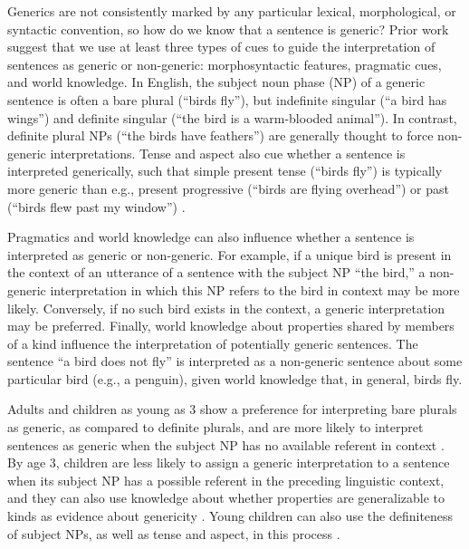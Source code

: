 \documentclass[10pt,letterpaper]{article}
\begin{document}
Generics are not consistently marked by any particular lexical, morphological, or syntactic convention, so how do we know that a sentence is generic? Prior work suggest that we use at least three types of cues to guide the interpretation of sentences as generic or non-generic: morphosyntactic features, pragmatic cues, and world knowledge. In English, the subject noun phase (NP) of a generic sentence is often a bare plural (``birds fly''), but indefinite singular (``a bird has wings'') and definite singular (``the bird is a warm-blooded animal''). In contrast, definite plural NPs (``the birds have feathers'') are generally thought to force non-generic interpretations. Tense and aspect also cue whether a sentence is interpreted generically, such that simple present tense (``birds fly'') is typically more generic than e.g., present progressive (``birds are flying overhead'') or past (``birds flew past my window'') \cite{Carlson:1977,Krifka:1995,Lyons:1977}. 

Pragmatics and world knowledge can also influence whether a sentence is interpreted as generic or non-generic. For example, if a unique bird is present in the context of an utterance of a sentence with the subject NP ``the bird,'' a non-generic interpretation in which this NP refers to the bird in context may be more likely. Conversely, if no such bird exists in the context, a generic interpretation may be preferred. Finally, world knowledge about properties shared by members of a kind influence the interpretation of potentially generic sentences. The sentence ``a bird does not fly'' is interpreted as a non-generic sentence about some particular bird (e.g., a penguin), given world knowledge that, in general, birds fly. 

Adults and children as young as 3 show a preference for interpreting bare plurals as generic, as compared to definite plurals, and are more likely to interpret sentences as generic when the subject NP has no available referent in context \cite{Gelman:2003}. By age 3, children are less likely to assign a generic interpretation to a sentence when its subject NP has a possible referent in the preceding linguistic context, and they can also use knowledge about whether properties are generalizable to kinds as evidence about genericity  \cite{Cimpian:2008}. Young children can also use the definiteness of subject NPs, as well as tense and aspect, in this process \cite{Cimpian:2011} .
\end{document}
